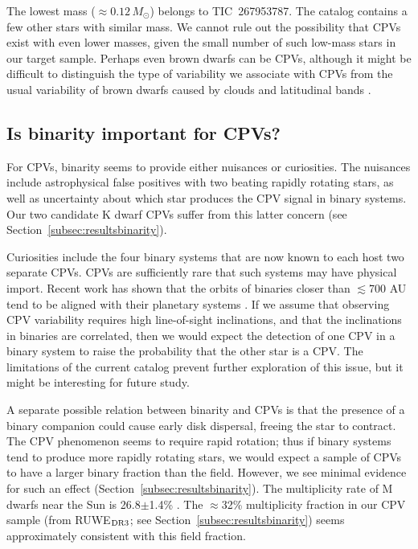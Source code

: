 \documentclass[11pt,twocolumn,tighten]{aastex63}
\begin{document}
The lowest mass ($\approx$$0.12$\,$M_\odot$) belongs to TIC~267953787.
The catalog contains a few other stars with similar mass.  We cannot
rule out the possibility that CPVs exist with even lower masses, given
the small number of such low-mass stars in our target sample.  Perhaps
even brown dwarfs can be CPVs, although it might be difficult to
distinguish the type of variability we associate with CPVs from the
usual variability of brown dwarfs caused by clouds and latitudinal
bands \citep[e.g.][]{2021ApJ...906...64A,2022ApJ...924...68V}.



\subsection{Is binarity important for CPVs?}
\label{subsec:discbinary}

For CPVs, binarity seems to provide either nuisances or curiosities.
The nuisances include astrophysical false positives with two beating
rapidly rotating stars, as well as uncertainty about which star
produces the CPV signal in binary systems.  Our two candidate K dwarf
CPVs suffer from this latter concern (see
Section~\ref{subsec:resultsbinarity}).

Curiosities include the four binary systems that are now known to each
host two separate CPVs.  CPVs are sufficiently rare that such systems
may have physical import.  Recent work has shown that the orbits of
binaries closer than $\lesssim$700 AU tend to be aligned with their
planetary systems \citep[e.g.][]{2022AJ....163..207C}.  If we assume
that observing CPV variability requires high line-of-sight
inclinations, and that the inclinations in binaries are correlated,
then we would expect the detection of one CPV in a binary system to
raise the probability that the other star is a CPV.  The limitations
of the current catalog prevent further exploration of this issue, but
it might be interesting for future study.

A separate possible relation between binarity and CPVs is that the
presence of a binary companion could cause early disk dispersal,
freeing the star to contract.  The CPV phenomenon seems to require
rapid rotation; thus if binary systems tend to produce more rapidly
rotating stars, we would expect a sample of CPVs to have a larger
binary fraction than the field.  However, we see minimal evidence for
such an effect (Section~\ref{subsec:resultsbinarity}).  The
multiplicity rate of M dwarfs near the Sun is 26.8$\pm$1.4\%
\citep{2019AJ....157..216W}.  The $\approx$32\% multiplicity fraction
in our CPV sample (from RUWE$_{\rm DR3}$; see
Section~\ref{subsec:resultsbinarity}) seems approximately consistent
with this field fraction.
\end{document}
